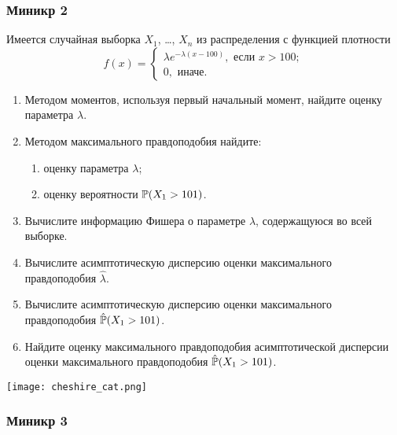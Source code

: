 \subsubsection*{Миникр 2}

Имеется случайная выборка $X_1$, \ldots, $X_n$ из распределения с функцией плотности
\[
f(x) = \begin{cases}
  \lambda e^{-\lambda(x-100)}, \text{ если } x > 100; \\
  0, \text{ иначе.}  
\end{cases}
\]
  
\begin{enumerate}
\item Методом моментов, используя первый начальный момент, найдите оценку параметра $\lambda$.
\item Методом максимального правдоподобия найдите:
\begin{enumerate}
\item оценку параметра $\lambda$;
\item оценку вероятности $\P(X_1 > 101)$.
\end{enumerate}
\item Вычислите информацию Фишера о параметре $\lambda$, содержащуюся во всей выборке.
\item Вычислите асимптотическую дисперсию оценки максимального правдоподобия $\hat\lambda$.
\item Вычислите асимптотическую дисперсию оценки максимального правдоподобия $\hat\P(X_1 > 101)$.
\item Найдите оценку максимального правдоподобия асимптотической дисперсии оценки максимального правдоподобия  
$\hat\P(X_1 > 101)$.
\end{enumerate}
\begin{center}
\begin{minipage}{3cm}
  \texttt{[image: cheshire\_cat.png]}
\end{minipage}
\end{center}



\subsubsection*{Миникр 3}

